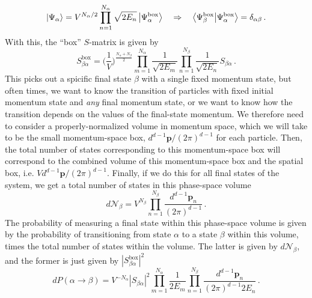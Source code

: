 \documentclass{article}
\numberwithin{equation}{subsection}
\begin{document}
\begin{equation}
	\ket{\Psi_\alpha} = V^{N_\alpha/2}\prod_{n=1}^{N_\alpha}\sqrt{2E_n}\ket{\Psi^{\text{box}}_\alpha} \quad \Rightarrow \quad 
	\braket{\Psi_\beta^{\text{box}}}{\Psi_\alpha^{\text{box}}} = \delta_{\alpha\beta}\,.
\end{equation}
With this, the ``box'' $S$-matrix is given by
\begin{equation}
	S^{\text{box}}_{\beta\alpha} = \Bigg(\frac{1}{V}\Bigg)^{\frac{N_\alpha + N_\beta}{2}}
	\prod_{m=1}^{N_\alpha}\frac{1}{\sqrt{2E_m}}\prod_{n=1}^{N_\beta}\frac{1}{\sqrt{2E_n}}S_{\beta\alpha}\,.
\end{equation}
This picks out a spicific final state $\beta$ with a single fixed momentum state, but often times, we want to know the transition of
particles with fixed initial momentum state and \textit{any} final momentum state, or we want to know how the transition depends on
the values of the final-state momentum. We therefore need to consider a properly-normalized volume in momentum space, which we will take
to be the small momentum-space box, $d^{d-1}\mathbf{p}/(2\pi)^{d - 1}$ for each particle. Then, the total number of states corresponding to this
momentum-space box will correspond to the combined volume of this momentum-space box and the spatial box, i.e. $Vd^{d-1}\mathbf{p}/(2\pi)^{d-1}$.
Finally, if we do this for all final states of the system, we get a total number of states in this phase-space volume
\begin{equation}
	d\mathcal{N}_\beta = V^{N_\beta}\prod_{n=1}^{N_\beta}\frac{d^{d-1}\mathbf{p}_n}{(2\pi)^{d-1}}\,.
\end{equation}
The probability of measuring a final state within this phase-space volume is given by the probability of transitioning from state $\alpha$ to a state
$\beta$ within this volume, times the total number of states within the volume. The latter is given by $d\mathcal{N}_\beta$, and the former is just
given by $|S_{\beta\alpha}^{\text{box}}|^2$
\begin{equation}
	dP(\alpha\to\beta) = V^{-N_\alpha}|S_{\beta\alpha}|^2\prod_{m=1}^{N_\alpha}\frac{1}{2E_m}\prod_{n = 1}^{N_\beta}\frac{d^{d-1}\mathbf{p}_n}{(2\pi)^{d-1}2E_n}\,.
\end{equation}
\end{document}
